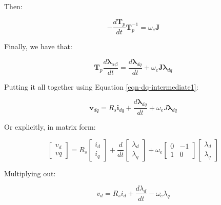 \documentclass{article}
\begin{document}
Then:

\begin{equation}
    -\frac{d\mathbf{T}_p}{dt}\mathbf{T}_p^{{-1}} = \omega_e\mathbf{J}
\end{equation}

Finally, we have that:

\begin{equation}
    \mathbf{T}_p\frac{d\boldsymbol{\lambda}_{\alpha\beta}}{dt} = \frac{d\boldsymbol{\lambda}_{dq}}{dt} + \omega_e\mathbf{J}\boldsymbol{\lambda}_{dq}
\end{equation}

Putting it all together using Equation \ref{eqn-dq-intermediate1}:

\begin{equation}
    \mathbf{v}_{dq}
    =
    R_s\mathbf{i}_{dq}
    +
    \frac{d\boldsymbol{\lambda}_{dq}}{dt} + \omega_eJ\boldsymbol{\lambda}_{dq}
\end{equation}

Or explicitly, in matrix form:

\begin{equation}
\label{eqn-dq-equations-flux-matrix-form}
    \begin{bmatrix}
        v_d \\
        vq
    \end{bmatrix}
    = R_s
    \begin{bmatrix}
        i_d \\
        i_q
    \end{bmatrix}
    +
    \frac{d}{dt}
    \begin{bmatrix}
        \lambda_d \\
        \lambda_q
    \end{bmatrix}
    + \omega_e
    \begin{bmatrix}
        0 & -1 \\
        1 & 0
    \end{bmatrix}
    \begin{bmatrix}
        \lambda_d \\
        \lambda_q
    \end{bmatrix}
\end{equation}

Multiplying out:

\begin{equation}
\label{eqn-vd-in-terms-of-flux}
    v_d = R_si_d + \frac{d\lambda_d}{dt} - \omega_e\lambda_q
\end{equation}
\end{document}
